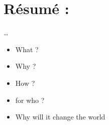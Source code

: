 \section*{Résumé :}

\ldots

\begin{itemize}

    \item What ?
    \item Why ?
    \item How ?
    \item for who ?
    \item Why will it change the world

\end{itemize}

